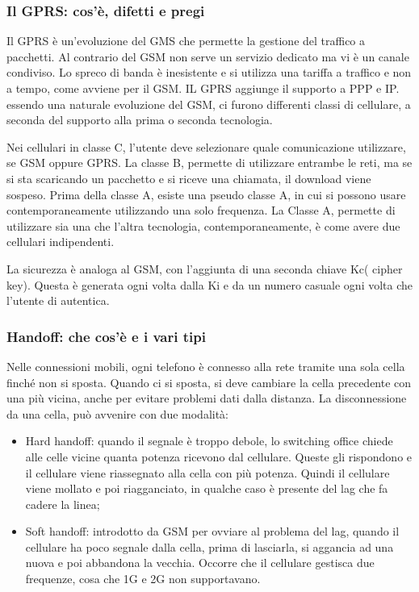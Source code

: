 \subsubsection{Il GPRS: cos'è, difetti e pregi}

Il GPRS è un'evoluzione del GMS che permette la gestione del traffico a pacchetti. Al contrario del
GSM non serve un servizio dedicato ma vi è un canale condiviso. Lo spreco di banda è inesistente e
si utilizza una tariffa a traffico e non a tempo, come avviene per il GSM. IL GPRS aggiunge il
supporto a PPP e IP. essendo una naturale evoluzione del GSM, ci furono differenti classi di
cellulare, a seconda del supporto alla prima o seconda tecnologia.

Nei cellulari in classe C, l'utente deve selezionare quale comunicazione utilizzare, se GSM oppure
GPRS. La classe B, permette di utilizzare entrambe le reti, ma se si sta scaricando un pacchetto e si
riceve una chiamata, il download viene sospeso. Prima della classe A, esiste una pseudo classe A, in
cui si possono usare contemporaneamente utilizzando una solo frequenza. La Classe A, permette di
utilizzare sia una che l'altra tecnologia, contemporaneamente, è come avere due cellulari
indipendenti.

La sicurezza è analoga al GSM, con l’aggiunta di una seconda chiave Kc( cipher key). Questa è
generata ogni volta dalla Ki e da un numero casuale ogni volta che l’utente di autentica.

\subsubsection{Handoff: che cos’è e i vari tipi}

Nelle connessioni mobili, ogni telefono è connesso alla rete tramite una sola cella finché non si
sposta. Quando ci si sposta, si deve cambiare la cella precedente con una più vicina, anche per
evitare problemi dati dalla distanza. La disconnessione da una cella, può avvenire con due modalità:

\begin{itemize}

\item Hard handoff: quando il segnale è troppo debole, lo switching office chiede alle celle vicine
quanta potenza ricevono dal cellulare. Queste gli rispondono e il cellulare viene riassegnato
alla cella con più potenza. Quindi il cellulare viene mollato e poi riagganciato, in qualche
caso è presente del lag che fa cadere la linea;
\item Soft handoff: introdotto da GSM per ovviare al problema del lag, quando il cellulare ha
poco segnale dalla cella, prima di lasciarla, si aggancia ad una nuova e poi abbandona la
vecchia. Occorre che il cellulare gestisca due frequenze, cosa che 1G e 2G non supportavano.

\end{itemize}


